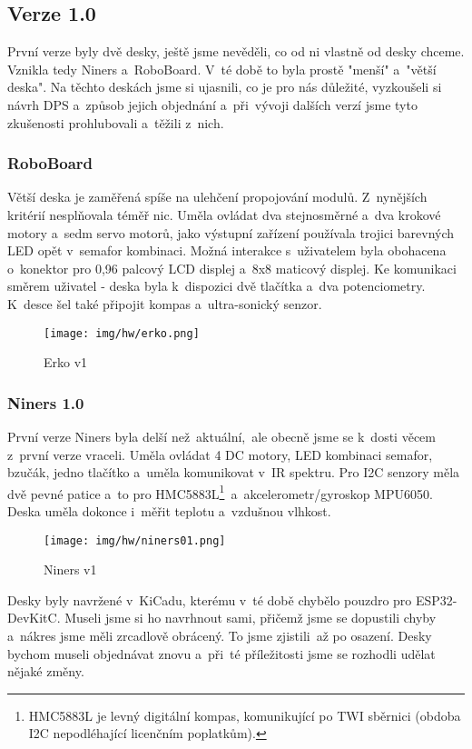 \subsection{Verze 1.0}
První verze byly dvě desky, ještě jsme nevěděli, co od ni vlastně od desky chceme. Vznikla tedy Niners a~RoboBoard. V~té době to byla prostě "menší" a~"větší deska". Na těchto deskách jsme si ujasnili, co je pro nás důležité, vyzkoušeli si návrh DPS a~způsob jejich objednání a~při~vývoji dalších verzí jsme tyto zkušenosti prohlubovali a~těžili z~nich.
\subsubsection{RoboBoard}
Větší deska je zaměřená spíše na ulehčení propojování modulů. Z~nynějších kritérií nesplňovala téměř nic. Uměla ovládat dva stejnosměrné a~dva krokové motory a~sedm servo motorů, jako výstupní zařízení používala trojici barevných LED opět v~semafor kombinaci. Možná interakce s~uživatelem byla obohacena o~konektor pro 0,96 palcový LCD displej a~8x8 maticový displej. Ke komunikaci směrem uživatel - deska byla k~dispozici dvě tlačítka a~dva potenciometry. K~desce šel také připojit kompas a~ultra-sonický senzor.
\begin{figure}[H]
  	\centering
 	\texttt{[image: img/hw/erko.png]}
 	\caption{Erko v1}
\end{figure}
\subsubsection{Niners 1.0}
První verze  Niners byla delší než~aktuální,~ale obecně jsme se k~dosti věcem z~první verze vraceli. Uměla ovládat 4 DC motory, LED kombinaci semafor, bzučák, jedno tlačítko a~uměla komunikovat v~IR spektru. Pro I2C senzory měla dvě pevné patice a~to pro  HMC5883L\footnote{HMC5883L je levný digitální kompas, komunikující po TWI sběrnici (obdoba I2C nepodléhající licenčním poplatkům).}~a~akcelerometr/gyroskop MPU6050. Deska uměla dokonce i~měřit teplotu a~vzdušnou vlhkost.

\begin{figure}[H]
  	\centering
 	\texttt{[image: img/hw/niners01.png]}
 	\caption{Niners v1}
\end{figure}

Desky byly navržené v~KiCadu, kterému v~té době chybělo pouzdro pro ESP32-DevKitC\cite{ESP32}. Museli jsme si ho navrhnout sami, přičemž jsme se dopustili chyby a~nákres jsme měli zrcadlově obrácený. To jsme zjistili~až po osazení. Desky bychom museli objednávat znovu a~při~té příležitosti jsme se rozhodli udělat nějaké změny.

